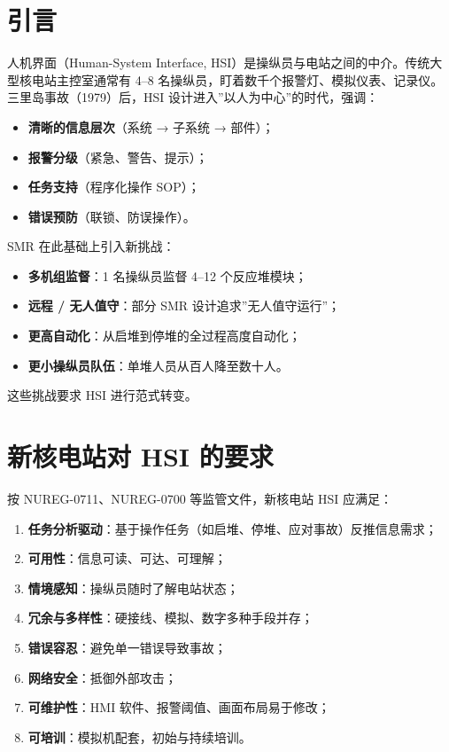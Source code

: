 \documentclass[
  UTF8,
  scheme=plain,
  fontsize=10pt,
  openany
]{ctexbook}
\begin{document}
\section{引言}\label{ux5f15ux8a00-6}

人机界面（Human-System Interface,
HSI）是操纵员与电站之间的中介。传统大型核电站主控室通常有 4--8
名操纵员，盯着数千个报警灯、模拟仪表、记录仪。三里岛事故（1979）后，HSI
设计进入''以人为中心''的时代，强调：

\begin{itemize}
\tightlist
\item
  \textbf{清晰的信息层次}（系统 → 子系统 → 部件）；
\item
  \textbf{报警分级}（紧急、警告、提示）；
\item
  \textbf{任务支持}（程序化操作 SOP）；
\item
  \textbf{错误预防}（联锁、防误操作）。
\end{itemize}

SMR 在此基础上引入新挑战：

\begin{itemize}
\tightlist
\item
  \textbf{多机组监督}：1 名操纵员监督 4--12 个反应堆模块；
\item
  \textbf{远程 / 无人值守}：部分 SMR 设计追求''无人值守运行''；
\item
  \textbf{更高自动化}：从启堆到停堆的全过程高度自动化；
\item
  \textbf{更小操纵员队伍}：单堆人员从百人降至数十人。
\end{itemize}

这些挑战要求 HSI 进行范式转变。

\section{新核电站对 HSI
的要求}\label{ux65b0ux6838ux7535ux7ad9ux5bf9-hsi-ux7684ux8981ux6c42}

按 NUREG-0711、NUREG-0700 等监管文件，新核电站 HSI 应满足：

\begin{enumerate}
\def\labelenumi{\arabic{enumi}.}
\tightlist
\item
  \textbf{任务分析驱动}：基于操作任务（如启堆、停堆、应对事故）反推信息需求；
\item
  \textbf{可用性}：信息可读、可达、可理解；
\item
  \textbf{情境感知}：操纵员随时了解电站状态；
\item
  \textbf{冗余与多样性}：硬接线、模拟、数字多种手段并存；
\item
  \textbf{错误容忍}：避免单一错误导致事故；
\item
  \textbf{网络安全}：抵御外部攻击；
\item
  \textbf{可维护性}：HMI 软件、报警阈值、画面布局易于修改；
\item
  \textbf{可培训}：模拟机配套，初始与持续培训。
\end{enumerate}
\end{document}
